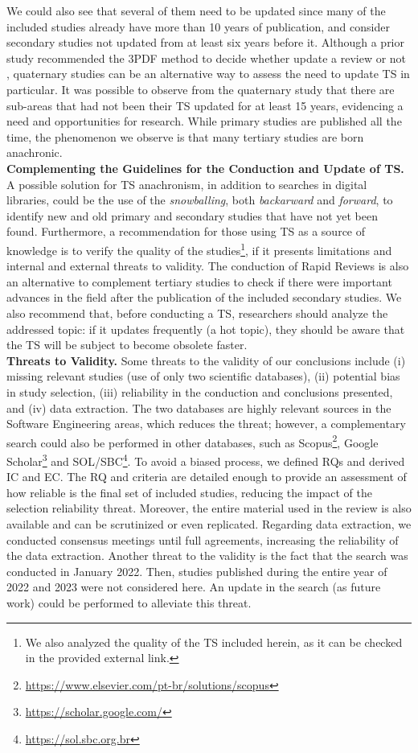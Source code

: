 \documentclass[sigconf]{acmart}
\begin{document}
We could also see that several of them need to be updated since many of the included studies already have more than 10 years of publication, and consider secondary studies not updated from at least six years before it. Although a prior study recommended the 3PDF method to decide whether update a review or not \cite{Mendes2020}, quaternary studies can be an alternative way to assess the need to update TS in particular. It was possible to observe from the quaternary study that there are sub-areas that had not been their TS updated for at least 15 years, evidencing a need and opportunities for research. While primary studies are published all the time, the phenomenon we observe is that many tertiary studies are born anachronic.
\\
\noindent\textbf{Complementing the Guidelines for the Conduction and Update of TS.} A possible solution for TS anachronism, in addition to searches in digital libraries, could be the use of the \textit{snowballing}, both \textit{backarward} and \textit{forward}, to identify new and old primary and secondary studies that have not yet been found. Furthermore, a recommendation for those using TS as a source of knowledge is to verify the quality of the studies\footnote{We also analyzed the quality of the TS included herein, as it can be checked in the provided external link.}, if it presents limitations and internal and external threats to validity. The conduction of Rapid Reviews is also an alternative to complement tertiary studies to check if there were important advances in the field after the publication of the included secondary studies. We also recommend that, before conducting a TS, researchers should analyze the addressed topic: if it updates frequently (a hot topic), they should be aware that the TS will be subject to become obsolete faster.
\\
\noindent\textbf{Threats to Validity.} Some threats to the validity of our conclusions include (i) missing relevant studies (use of only two scientific databases), (ii) potential bias in study selection, (iii) reliability in the conduction and conclusions presented, and (iv) data extraction. The two databases are highly relevant sources in the Software Engineering areas, which reduces the threat; however, a complementary search could also be performed in other databases, such as Scopus\footnote{\url{https://www.elsevier.com/pt-br/solutions/scopus}}, Google Scholar\footnote{\url{https://scholar.google.com/}} and SOL/SBC\footnote{\url{https://sol.sbc.org.br}}. To avoid a biased process, we defined RQs and derived IC and EC. The RQ and criteria are detailed enough to provide an assessment of how reliable is the final set of included studies, reducing the impact of the selection reliability threat. Moreover, the entire material used in the review is also available and can be scrutinized or even replicated. Regarding data extraction, we conducted consensus meetings until full agreements, increasing the reliability of the data extraction. Another threat to the validity is the fact that the search was conducted in January 2022. Then, studies published during the entire year of 2022 and 2023 were not considered here. An update in the search (as future work) could be performed to alleviate this threat.
\end{document}
